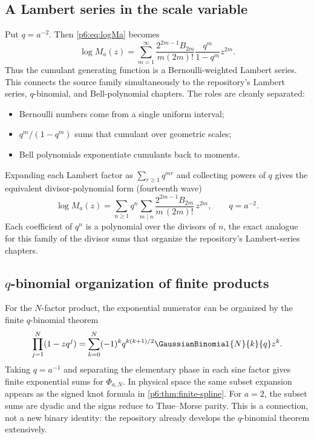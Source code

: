 \documentclass[11pt,oneside]{article}
\numberwithin{equation}{section}
\theoremstyle{definition}
\theoremstyle{remark}
\begin{document}
\subsection{A Lambert series in the scale variable}

Put $q=a^{-2}$.  Then \eqref{p6:eq:logMa} becomes
\begin{equation}\label{p6:eq:Lambert-moment-series}
 \log M_a(z)=
 \sum_{m=1}^{\infty}
 \frac{2^{2m-1}B_{2m}}{m(2m)!}
 \frac{q^m}{1-q^m}z^{2m}.
\end{equation}
Thus the cumulant generating function is a Bernoulli-weighted Lambert series.
This connects the source family simultaneously to the repository's Lambert
series, $q$-binomial, and Bell-polynomial chapters.  The roles are cleanly
separated:
\begin{itemize}
\item Bernoulli numbers come from a single uniform interval;
\item $q^m/(1-q^m)$ sums that cumulant over geometric scales;
\item Bell polynomials exponentiate cumulants back to moments.
\end{itemize}
Expanding each Lambert factor as $\sum_{r\ge1}q^{mr}$ and collecting powers of
$q$ gives the equivalent divisor-polynomial form (fourteenth wave)
\begin{equation}\label{p6:eq:divisor-polynomial}
 \log M_a(z)=\sum_{n\ge1}q^{n}
 \sum_{m\mid n}
 \frac{2^{2m-1}B_{2m}}{m\,(2m)!}\,z^{2m},
 \qquad q=a^{-2}.
\end{equation}
Each coefficient of $q^n$ is a polynomial over the divisors of $n$, the exact
analogue for this family of the divisor sums that organize the repository's
Lambert-series chapters.

\subsection{\texorpdfstring{$q$}{q}-binomial organization of finite products}

For the $N$-factor product, the exponential numerator can be organized by the
finite $q$-binomial theorem
\begin{equation}\label{p6:eq:q-binomial}
 \prod_{j=1}^{N}(1-zq^j)
 =\sum_{k=0}^{N}(-1)^kq^{k(k+1)/2}
 \GaussianBinomial{N}{k}{q}z^k.
\end{equation}
Taking $q=a^{-1}$ and separating the elementary phase in each sine factor gives
finite exponential sums for $\Phi_{a,N}$.  In physical space the same subset
expansion appears as the signed knot formula in
\cref{p6:thm:finite-spline}.  For $a=2$, the subset sums are dyadic and the signs
reduce to Thue--Morse parity.  This is a connection, not a new binary identity:
the repository already develops the $q$-binomial theorem extensively.
\end{document}
